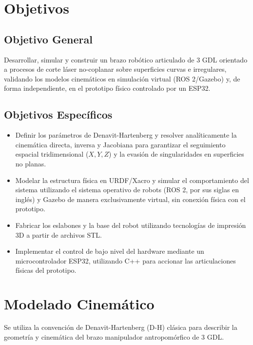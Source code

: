 \documentclass[conference,a4paper]{IEEEtran}
\begin{document}
\section{Objetivos}
\subsection{Objetivo General}
Desarrollar, simular y construir un brazo robótico articulado de 3 GDL orientado a procesos de corte láser no-coplanar sobre superficies curvas e irregulares, validando los modelos cinemáticos en simulación virtual (ROS 2/Gazebo) y, de forma independiente, en el prototipo físico controlado por un ESP32.

\subsection{Objetivos Específicos}
\begin{itemize}
    \item Definir los parámetros de Denavit-Hartenberg y resolver analíticamente la cinemática directa, inversa y Jacobiana para garantizar el seguimiento espacial tridimensional ($X, Y, Z$) y la evasión de singularidades en superficies no planas.
    \item Modelar la estructura física en URDF/Xacro y simular el comportamiento del sistema utilizando el sistema operativo de robots (ROS 2, por sus siglas en inglés) y Gazebo de manera exclusivamente virtual, sin conexión física con el prototipo.
    \item Fabricar los eslabones y la base del robot utilizando tecnologías de impresión 3D a partir de archivos STL.
    \item Implementar el control de bajo nivel del hardware mediante un microcontrolador ESP32, utilizando C++ para accionar las articulaciones físicas del prototipo.
\end{itemize}

\section{Modelado Cinemático}
Se utiliza la convención de Denavit-Hartenberg (D-H) clásica para describir la geometría y cinemática del brazo manipulador antropomórfico de 3 GDL.
\end{document}
